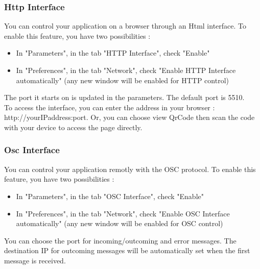 \documentclass[a4paper]{article}
\begin{document}
\subsubsection{Http Interface}
	You can control your application on a browser through an Html interface. To enable this feature, you have two possibilities :
	\begin{itemize}
	\item In "Parameters", in the tab "HTTP Interface", check "Enable"
	\item In "Preferences", in the tab "Network", check "Enable HTTP Interface automatically" (any new window will be enabled for HTTP control)
	\end{itemize}
	
The port it starts on is updated in the parameters. The default port is 5510.\\
	To access the interface, you can enter the address in your browser : http://yourIPaddress:port.	
	Or, you can choose view QrCode then scan the code with your device to access the page directly. 

\subsubsection{Osc Interface}
	You can control your application remotly with the OSC protocol. 
	To enable this feature, you have two possibilities :
	\begin{itemize}
	\item In "Parameters", in the tab "OSC Interface", check "Enable"
	\item In "Preferences", in the tab "Network", check "Enable OSC Interface automatically" (any new window will be enabled for OSC control)
	\end{itemize}
	You can choose the port for incoming/outcoming and error messages. The destination IP for outcoming messages will be automatically set when the first message is received. 

\end{document}
